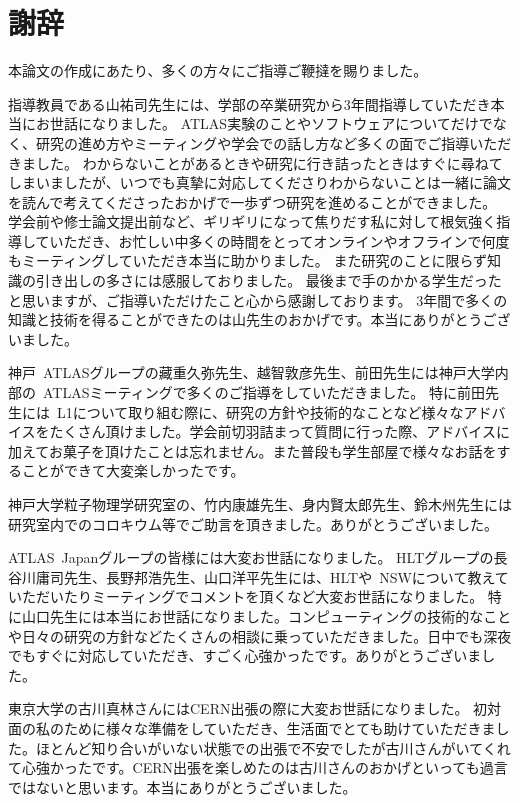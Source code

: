 \chapter*{謝辞}

本論文の作成にあたり、多くの方々にご指導ご鞭撻を賜りました。

指導教員である山\ajTatsuSaki 祐司先生には、学部の卒業研究から3年間指導していただき本当にお世話になりました。
ATLAS実験のことやソフトウェアについてだけでなく、研究の進め方やミーティングや学会での話し方など多くの面でご指導いただきました。
わからないことがあるときや研究に行き詰ったときはすぐに尋ねてしまいましたが、いつでも真摯に対応してくださりわからないことは一緒に論文を読んで考えてくださったおかげで一歩ずつ研究を進めることができました。
学会前や修士論文提出前など、ギリギリになって焦りだす私に対して根気強く指導していただき、お忙しい中多くの時間をとってオンラインやオフラインで何度もミーティングしていただき本当に助かりました。
また研究のことに限らず知識の引き出しの多さには感服しておりました。
最後まで手のかかる学生だったと思いますが、ご指導いただけたこと心から感謝しております。
3年間で多くの知識と技術を得ることができたのは山\ajTatsuSaki 先生のおかげです。本当にありがとうございました。

神戸~ATLASグループの藏重久弥先生、越智敦彦先生、前田先生には神戸大学内部の~ATLASミーティングで多くのご指導をしていただきました。
特に前田先生には~L1について取り組む際に、研究の方針や技術的なことなど様々なアドバイスをたくさん頂けました。学会前切羽詰まって質問に行った際、アドバイスに加えてお菓子を頂けたことは忘れません。また普段も学生部屋で様々なお話をすることができて大変楽しかったです。

神戸大学粒子物理学研究室の、竹内康雄先生、身内賢太郎先生、鈴木州先生には研究室内でのコロキウム等でご助言を頂きました。ありがとうございました。

ATLAS~Japanグループの皆様には大変お世話になりました。
HLTグループの長谷川庸司先生、長野邦浩先生、山口洋平先生には、HLTや~NSWについて教えていただいたりミーティングでコメントを頂くなど大変お世話になりました。
特に山口先生には本当にお世話になりました。コンピューティングの技術的なことや日々の研究の方針などたくさんの相談に乗っていただきました。日中でも深夜でもすぐに対応していただき、すごく心強かったです。ありがとうございました。

東京大学の古川真林さんにはCERN出張の際に大変お世話になりました。
初対面の私のために様々な準備をしていただき、生活面でとても助けていただきました。ほとんど知り合いがいない状態での出張で不安でしたが古川さんがいてくれて心強かったです。CERN出張を楽しめたのは古川さんのおかげといっても過言ではないと思います。本当にありがとうございました。

